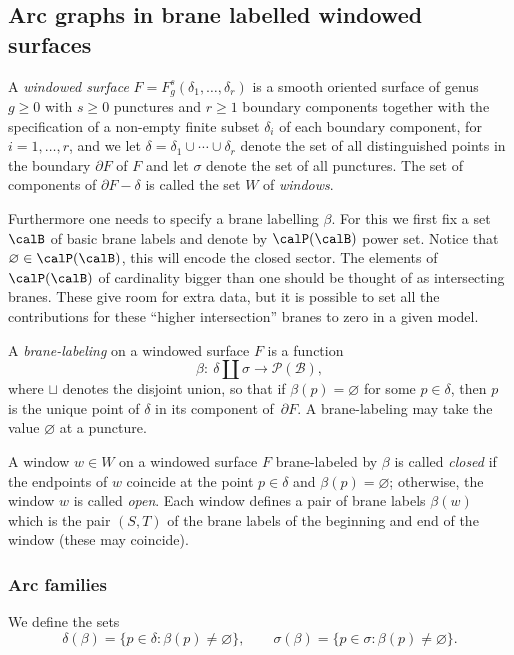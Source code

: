 \subsection{Arc graphs in brane labelled windowed surfaces}

A {\it windowed surface} $F=F^s_g(\delta_1,\ldots ,\delta _r)$ is a
smooth oriented surface of genus $g\geq 0$ with $s\geq 0$ punctures and
$r\geq 1$ boundary components together with the specif\/ication of a
non-empty f\/inite subset $\delta _i$ of each boundary component,
for $i=1,\ldots ,r$, and we let $\delta =\delta
_1\cup\cdots\cup\delta _r$ denote the set of all distinguished points in the boundary
$\partial F$ of $F$ and let  $\sigma$ denote the set of all punctures.
The set of components of
$\partial F-\delta$ is called the set $W$ of {\it windows}.

Furthermore one needs to specify a brane labelling $\beta$.
For this we f\/irst f\/ix a set $\calB$ of basic brane labels
and denote by $\calP(\calB)$  power set.  Notice that $\varnothing\in\calP(\calB) $,
this will encode the closed sector. The elements of $\calP(\calB)$ of cardinality
bigger than one should be thought of as intersecting branes. These
give room for extra data, but it is possible to set all the contributions
for these  ``higher intersection'' branes
to zero in a given model.


A {\it brane-labeling} on a windowed surface $F$ is a function
\[
\beta : \ \delta\coprod\sigma\to{\mathcal P}({\mathcal B}),
\]
where $\sqcup$ denotes the disjoint union, so that if $\beta
(p)=\varnothing$ for some $p\in\delta$, then $p$ is the unique point
of $\delta$ in its component of~$\partial F$.  A brane-labeling
may take the value $\varnothing$ at a puncture.



A window $w\in W$ on a windowed surface $F$ brane-labeled by
$\beta$ is called {\it closed} if the endpoints of $w$ coincide at
the point $p\in\delta$ and $\beta (p)=\varnothing$; otherwise, the
window $w$ is called {\it open}.
Each window def\/ines a pair of brane labels $\beta(w)$ which is
the pair $(S,T)$ of the brane labels of the beginning and end of the window (these
may coincide).

\subsubsection{Arc families}

We def\/ine the sets
\[
\delta
(\beta )=\{ p\in\delta :\beta (p)\neq\varnothing\},\qquad \sigma
(\beta )=\{ p\in\sigma :\beta (p)\neq\varnothing\} .
\]


